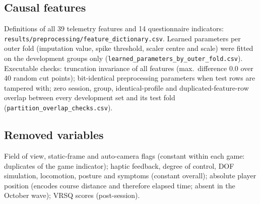 \subsection{Causal features}
Definitions of all 39 telemetry features and 14 questionnaire indicators: \texttt{results/\allowbreak preprocessing/\allowbreak feature\_dictionary.csv}. Learned parameters per outer fold (imputation value, spike threshold, scaler centre and scale) were fitted on the development groups only (\texttt{learned\_parameters\_by\_outer\_fold.csv}). Executable checks: truncation invariance of all features (max.\ difference 0.0 over 40 random cut points); bit-identical preprocessing parameters when test rows are tampered with; zero session, group, identical-profile and duplicated-feature-row overlap between every development set and its test fold (\texttt{partition\_overlap\_checks.csv}).

\subsection{Removed variables}
Field of view, static-frame and auto-camera flags (constant within each game: duplicates of the game indicator); haptic feedback, degree of control, DOF simulation, locomotion, posture and symptoms (constant overall); absolute player position (encodes course distance and therefore elapsed time; absent in the October wave); VRSQ scores (post-session).
